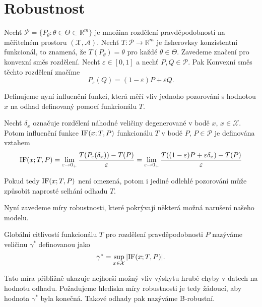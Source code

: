 \chapter{Robustnost}

Nech\v{t} $\mathcal{P} = \lbrace P_\theta : \theta \in \Theta \subset \mathbb{R}^m \rbrace$ je množina rozdělení pravděpodobností na měřitelném prostoru $\left(\mathcal{X},\mathcal{A}\right)$. Nech\v{t} $T: \mathcal{P} \rightarrow \mathbb{R}^m$ je fisherovksy konzistentní funkcionál, to znamená, že $T(P_\theta) = \theta$ pro každé $\theta \in \Theta$. Zavedeme značení pro konvexní směs rozdělení. Nech\v{t} $\varepsilon \in [0,1]$ a nech\v{t} $P, Q \in \mathcal{P}$. Pak Konvexní směs těchto rozdělení značíme 
\begin{equation}
	P_\varepsilon(Q) = (1-\varepsilon)P + \varepsilon Q.
\end{equation}

\noindent
Definujeme nyní influenční funkci, která měří vliv jednoho pozorování s hodnotou $x$ na odhad definovaný pomocí funkcionálu $T$. 

\begin{definition}
	Nech\v{t} $\delta_x$ označuje rozdělení náhodné veličiny degenerované v bodě $x,\, x \in \mathcal{X}$. Potom influenční funkce $\mathrm{IF}({x};T,P)$ funkcionálu $T$ v bodě $P,\, P \in \mathcal{P}$ je definována vztahem
	\begin{equation}
		\mathrm{IF}({x};T,P) = \lim_{\varepsilon \rightarrow 0_+} \frac{T(P_\varepsilon(\delta_x)) - T(P)}{\varepsilon} = \lim_{\varepsilon \rightarrow 0_+} \frac{T((1-\varepsilon)P + \varepsilon\delta_x) - T(P)}{\varepsilon}
	\end{equation} 
\end{definition}

\noindent
Pokud tedy $\mathrm{IF}({x};T,P)$ není omezená, potom i jediné odlehlé pozorování může způsobit naprosté selhání odhadu $T$. 

Nyní zavedeme míry robustnosti, které pokrývají některá možná narušení našeho modelu. 

\begin{definition}
	Globální citlivostí funkcionálu $T$ pro rozdělení pravděpodobnosti $P$ nazýváme veličinu $\gamma^*$ definovanou jako
	\begin{equation}
		\gamma^* = \sup_{x \in \mathcal{X}} |\mathrm{IF}({x};T,P)|.
	\end{equation}
\end{definition}
Tato míra přibližně ukazuje nejhorší možný vliv výskytu hrubé chyby v datech na hodnotu odhadu. Požadujeme hlediska míry robustnosti je tedy žádoucí, aby hodnota $\gamma^*$ byla konečná. Takové odhady pak nazýváme B-robustní.

